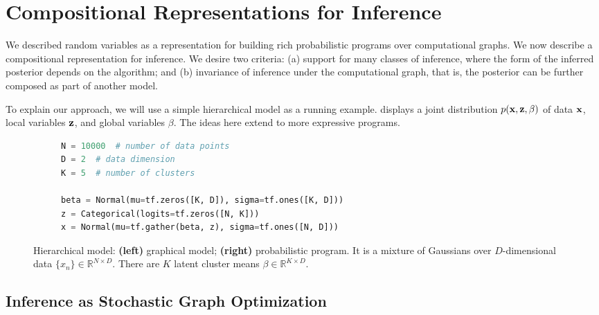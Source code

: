 \section{Compositional Representations for Inference}
\label{sec:inference}

We described random variables as a representation for building
rich probabilistic programs over computational graphs.  We now
describe a compositional representation for inference.
We desire two criteria: (a) support for many classes of
inference, where the form of the inferred posterior depends on the
algorithm; and (b) invariance of inference under the computational
graph, that is, the posterior can be further composed as part of
another model.

To explain our approach, we will use a simple hierarchical model as a
running example.  displays a
joint distribution $p(\boldsymbol{\mathbf{x}}, \boldsymbol{\mathbf{z}}, \beta)$ of data $\boldsymbol{\mathbf{x}}$, local
variables $\boldsymbol{\mathbf{z}}$, and global variables $\beta$. The ideas here extend
to more expressive programs.

\begin{figure}[!h]
\begin{subfigure}{0.35\columnwidth}
  \centering
  
\end{subfigure}%
\begin{subfigure}{0.6\columnwidth}
  \centering
\begin{lstlisting}[language=python]
N = 10000  # number of data points
D = 2  # data dimension
K = 5  # number of clusters

beta = Normal(mu=tf.zeros([K, D]), sigma=tf.ones([K, D]))
z = Categorical(logits=tf.zeros([N, K]))
x = Normal(mu=tf.gather(beta, z), sigma=tf.ones([N, D]))
\end{lstlisting}
\end{subfigure}
\caption{Hierarchical model: \textbf{(left)} graphical model; \textbf{(right)}
  probabilistic program. It is a mixture of Gaussians over
  $D$-dimensional data $\{x_n\}\in\mathbb{R}^{N\times D}$. There are
  $K$ latent cluster means $\beta\in\mathbb{R}^{K\times D}$.}
\label{fig:hierarchical_model_example}
\end{figure}

\subsection{Inference as Stochastic Graph Optimization}
\label{sub:inference}

